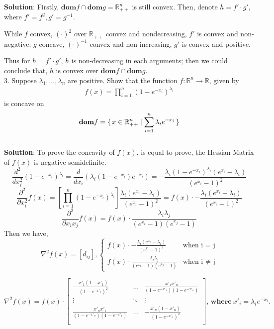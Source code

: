 \documentclass{article}
\begin{document}
\textbf{Solution}:
Firstly, $\textbf{dom}f \cap \textbf{dom}g = \mathbb{R}_{++}^n$ is still convex.
Then, denote $h = f' \cdot g'$, where $f' = f^2, g'=g^{-1}$.

While $f$ convex, $(\cdot)^2$ over $\mathbb{R}_{++}$ convex and nondecreasing, $f'$ is convex and non-negative;
$g$ concave, $(\cdot)^{-1}$ convex and non-increasing, $g'$ is convex and positive.

Thus for $h = f' \cdot g'$, $\tilde{h}$ is non-decreasing in each arguments; then we could conclude that, $h$ is convex over $\textbf{dom}f \cap \textbf{dom}g$. \\

3. Suppose $\lambda_1, \dots, \lambda_n$ are positive. Show that the function $f:\mathbb{R}^n\to\mathbb{R}$, given by \\
\begin{align}
	f(x)=\prod_{i=1}^n (1-e^{-x_i})^{\lambda_i} \nonumber
\end{align}
is concave on
\begin{align}
	\textbf{dom} f = \set{x\in\mathbb{R}_{++}^n | \sum_{i=1}^n \lambda_i e^{-x_i}} \nonumber
\end{align} \\

\textbf{Solution}:
To prove the concavity of $f(x)$, is equal to prove, the Hessian Matrix of $f(x)$ is negative semidefinite.
\[
	\frac{d^2}{dx_i^2}(1-e^{-x_i})^{\lambda_i} = \frac{d}{dx_i}(\lambda_i(1-e^{-x_i})e^{-x_i}) = -\frac{\lambda_i(1-e^{-x_i})^{\lambda_i}(e^{x_i}-\lambda_i)}{(e^{x_i}-1)^2}
\]
\[
	\frac{\partial^2}{\partial x_i^2} f(x) = [\prod_{i=1}^n (1-e^{-x_i})^{\lambda_i}] \frac{\lambda_i(e^{x_i}-\lambda_i)}{(e^{x_i}-1)^2} =
	f(x) \cdot -\frac{\lambda_i(e^{x_i}-\lambda_i)}{(e^{x_i}-1)^2}
\]
\[
	\frac{\partial^2}{\partial x_i x_j} f(x) = f(x) \cdot \frac{\lambda_i \lambda_j}{(e^{x_i} - 1)(e^{x_j} - 1)}
\]
Then we have,
\[
	\nabla^2 f(x) = [d_{ij}],
	\begin{cases}
		f(x) \cdot -\frac{\lambda_i(e^{x_i}-\lambda_i)}{(e^{x_i}-1)^2} & \text{when i = j} \\
		f(x) \cdot \frac{\lambda_i \lambda_j}{(e^{x_i} - 1)(e^{x_j} - 1)} & \text{when i $\neq$ j}
	\end{cases}
\]

\[
	\nabla^2 f(x) = f(x) \cdot
	\begin{bmatrix}
		-\frac{x'_1(1-x'_1)}{(1-e^{-x'_1})^2} &
		\dots &
		\frac{x'_1 x'_n}{(1-e^{-x'_1})(1-e^{-x'_n})} \\

		\vdots &  \ddots & \vdots \\
		
		\frac{x'_n x'_1}{(1-e^{-x'_n})(1-e^{-x'_1})} &
		\dots &
		-\frac{x'_n(1-x'_n)}{(1-e^{-x'_n})^2} \\
	\end{bmatrix}
	\textbf{, where}\ x'_i = \lambda_i e^{-x_i}.
\]
\end{document}
